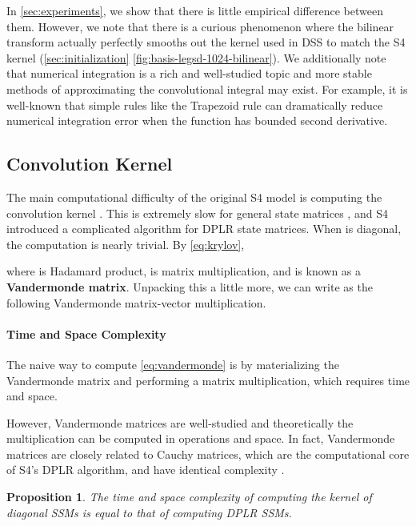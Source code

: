 \documentclass{article}
\newtheorem{proposition}[theorem]{Proposition}
\begin{document}
In \cref{sec:experiments}, we show that there is little empirical difference between them.
However, we note that there is a curious phenomenon where the bilinear transform actually perfectly smooths out the kernel used in DSS to match the S4 kernel (\cref{sec:initialization} \cref{fig:basis-legsd-1024-bilinear}).
We additionally note that numerical integration is a rich and well-studied topic and more stable methods of approximating the convolutional integral may exist.
For example, it is well-known that simple rules like the Trapezoid rule \citep{ralston2001first} can dramatically reduce numerical integration error when the function has bounded second derivative.


\subsection{Convolution Kernel}

The main computational difficulty of the original S4 model is computing the convolution kernel .
This is extremely slow for general state matrices ,
and S4 introduced a complicated algorithm for DPLR state matrices.
When  is diagonal, the computation is nearly trivial.
By \eqref{eq:krylov},

where  is Hadamard product,  is matrix multiplication, and  is known as a \textbf{Vandermonde matrix}.
Unpacking this a little more, we can write  as the following Vandermonde matrix-vector multiplication.


\paragraph{Time and Space Complexity}

The naive way to compute \eqref{eq:vandermonde} is by materializing the Vandermonde matrix  and performing a matrix multiplication,
which requires  time and space.

However, Vandermonde matrices are well-studied and theoretically the multiplication can be computed in
 operations and  space.
In fact, Vandermonde matrices are closely related to Cauchy matrices, which are the computational core of S4's DPLR algorithm,
and have identical complexity \citep{pan2001structured}.

\begin{proposition}The time and space complexity of computing the kernel of diagonal SSMs is equal to that of computing DPLR SSMs.
\end{proposition}
\end{document}
